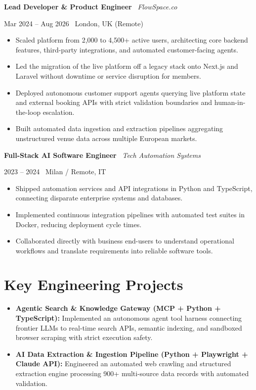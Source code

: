 \documentclass[a4paper,10pt]{article}
\newcommand{\role}[4]{%
  \vspace{2pt}\noindent
  \begin{minipage}[t]{0.70\textwidth}\raggedright\textbf{#1} \textbullet\ \textit{#3}\end{minipage}%
  \hfill
  \begin{minipage}[t]{0.28\textwidth}\raggedleft\footnotesize\color{gray}#2 \textbullet\ #4\end{minipage}%
  \vspace{1pt}%
}
\begin{document}
\vspace{3pt}
\role{Lead Developer \& Product Engineer}{Mar 2024 -- Aug 2026}{FlowSpace.co}{London, UK (Remote)}
\begin{itemize}
  \item Scaled platform from 2,000 to 4,500+ active users, architecting core backend features, third-party integrations, and automated customer-facing agents.
  \item Led the migration of the live platform off a legacy stack onto Next.js and Laravel without downtime or service disruption for members.
  \item Deployed autonomous customer support agents querying live platform state and external booking APIs with strict validation boundaries and human-in-the-loop escalation.
  \item Built automated data ingestion and extraction pipelines aggregating unstructured venue data across multiple European markets.
\end{itemize}

\vspace{3pt}
\role{Full-Stack AI Software Engineer}{2023 -- 2024}{Tech Automation Systems}{Milan / Remote, IT}
\begin{itemize}
  \item Shipped automation services and API integrations in Python and TypeScript, connecting disparate enterprise systems and databases.
  \item Implemented continuous integration pipelines with automated test suites in Docker, reducing deployment cycle times.
  \item Collaborated directly with business end-users to understand operational workflows and translate requirements into reliable software tools.
\end{itemize}

\section{Key Engineering Projects}
\begin{itemize}
  \item \textbf{Agentic Search \& Knowledge Gateway (MCP + Python + TypeScript):} Implemented an autonomous agent tool harness connecting frontier LLMs to real-time search APIs, semantic indexing, and sandboxed browser scraping with strict execution safety.
  \item \textbf{AI Data Extraction \& Ingestion Pipeline (Python + Playwright + Claude API):} Engineered an automated web crawling and structured extraction engine processing 900+ multi-source data records with automated validation.
\end{itemize}
\end{document}
